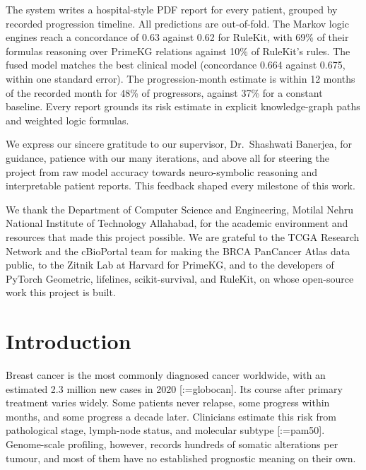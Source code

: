 \documentclass{mnnit}
\makeatletter
\newcommand{\rc}[1]{[\def\rc@sep{}\@for\rc@key:=#1\do{\rc@sep\ref{ref:\rc@key}\def\rc@sep{, }}]}
\makeatother
\begin{document}
The system writes a hospital-style PDF report for every patient, grouped by recorded progression timeline. All
predictions are out-of-fold. The Markov logic engines reach a concordance of 0.63 against 0.62 for RuleKit, with
69\% of their formulas reasoning over PrimeKG relations against 10\% of RuleKit's rules. The fused model matches the
best clinical model (concordance 0.664 against 0.675, within one standard error). The progression-month estimate
is within 12 months of the recorded month for 48\% of progressors, against 37\% for a constant baseline. Every
report grounds its risk estimate in explicit knowledge-graph paths and weighted logic formulas.

We express our sincere gratitude to our supervisor, Dr.\ Shashwati Banerjea, for guidance, patience with
our many iterations, and above all for steering the project from raw model accuracy towards neuro-symbolic
reasoning and interpretable patient reports. This feedback shaped every milestone of this work.

We thank the Department of Computer Science and Engineering, Motilal Nehru National Institute of Technology
Allahabad, for the academic environment and resources that made this project possible. We are grateful to the
TCGA Research Network and the cBioPortal team for making the BRCA PanCancer Atlas data public, to the Zitnik Lab
at Harvard for PrimeKG, and to the developers of PyTorch Geometric, lifelines, scikit-survival, and RuleKit, on
whose open-source work this project is built.

\afterpreface

\chapter{Introduction}

Breast cancer is the most commonly diagnosed cancer worldwide, with an estimated 2.3 million new cases in 2020
\rc{globocan}. Its course after primary treatment varies widely. Some patients never relapse, some progress within
months, and some progress a decade later. Clinicians estimate this risk from pathological stage, lymph-node
status, and molecular subtype \rc{pam50}. Genome-scale profiling, however, records hundreds of somatic alterations
per tumour, and most of them have no established prognostic meaning on their own.
\end{document}
